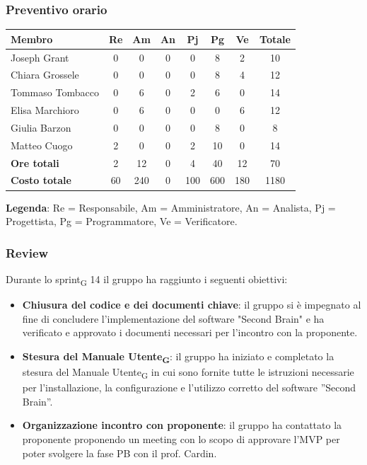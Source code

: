 \documentclass[11pt,a4paper]{article}
\newcommand{\gls}[1]{#1\textsubscript{G}}
\begin{document}
\subsubsection{Preventivo orario}
\begin{center}
    \begin{tabular}{|l|c|c|c|c|c|c|c|}
        \hline
        \textbf{Membro} & \textbf{Re} & \textbf{Am} & \textbf{An} & \textbf{Pj} & \textbf{Pg} & \textbf{Ve} & \textbf{Totale} \\
        \hline
        Joseph Grant & 0 & 0 & 0 & 0 & 8 & 2 & 10 \\
        \hline
        Chiara Grossele & 0 & 0 & 0 & 0 & 8 & 4 & 12 \\
        \hline
        Tommaso Tombacco & 0 & 6 & 0 & 2 & 6 & 0 & 14 \\
        \hline
        Elisa Marchioro & 0 & 6 & 0 & 0 & 0 & 6 & 12 \\
        \hline
        Giulia Barzon & 0 & 0 & 0 & 0 & 8 & 0 & 8 \\
        \hline
        Matteo Cuogo & 2 & 0 & 0 & 2 & 10 & 0 & 14 \\
        \hline
        \textbf{Ore totali} & 2 & 12 & 0 & 4 & 40 & 12 & 70 \\
        \hline
        \textbf{Costo totale} & 60 & 240 & 0 & 100 & 600 & 180 & 1180 \\
        \hline
    \end{tabular}
\end{center}

\noindent \textbf{Legenda}: Re = Responsabile, Am = Amministratore, An = Analista, Pj = Progettista, Pg = Programmatore, Ve = Verificatore.

\subsubsection{Review}
Durante lo \gls{sprint} 14 il gruppo ha raggiunto i seguenti obiettivi:
\begin{itemize}
    \item \textbf{Chiusura del codice e dei documenti chiave}: il gruppo si è impegnato al fine di concludere l'implementazione del software "Second Brain" e ha verificato e approvato i documenti necessari per l'incontro con la proponente.
    \item \textbf{Stesura del \gls{Manuale Utente}}: il gruppo ha iniziato e completato la stesura del \gls{Manuale Utente} in cui sono fornite tutte le istruzioni necessarie per l’installazione, la configurazione e l’utilizzo corretto del software ”Second Brain”.
    \item \textbf{Organizzazione incontro con proponente}: il gruppo ha contattato la proponente proponendo un meeting con lo scopo di approvare l'MVP per poter svolgere la fase PB con il prof. Cardin.
\end{itemize}
\end{document}
